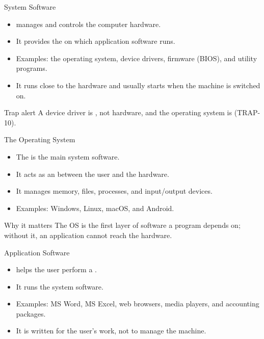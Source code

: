 \documentclass[aspectratio=169]{beamer}
\begin{document}
\begin{frame}{System Software}
  \begin{itemize}
    \item {} manages and controls the computer hardware.
    \item It provides the  on which application software runs.
    \item Examples: the operating system, device drivers, firmware (BIOS),
      and utility programs.
    \item It runs close to the hardware and usually starts when the machine
      is switched on.
  \end{itemize}
  \begin{alertblock}{Trap alert}
    A device driver is , not hardware, and the operating system
    is  (TRAP-10).
  \end{alertblock}
\end{frame}

\begin{frame}{The Operating System}
  \begin{itemize}
    \item The  is the main system software.
    \item It acts as an  between the user and the hardware.
    \item It manages memory, files, processes, and input/output devices.
    \item Examples: Windows, Linux, macOS, and Android.
  \end{itemize}
  \begin{block}{Why it matters}
    The OS is the first layer of software a program depends on; without it,
    an application cannot reach the hardware.
  \end{block}
\end{frame}

\begin{frame}{Application Software}
  \begin{itemize}
    \item {} helps the user perform a .
    \item It runs  the system software.
    \item Examples: MS Word, MS Excel, web browsers, media players, and
      accounting packages.
    \item It is written for the user's work, not to manage the machine.
  \end{itemize}
\end{frame}
\end{document}

